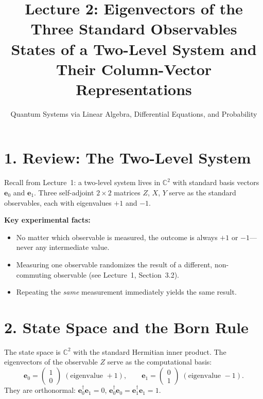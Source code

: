 \documentclass[12pt,a4paper]{article}
\title{\textbf{Lecture 2: Eigenvectors of the Three Standard Observables} \\ \large States of a Two-Level System and Their Column-Vector Representations}
\author{Quantum Systems via Linear Algebra, Differential Equations, and Probability}
\date{}
\begin{document}
\maketitle
\thispagestyle{fancy}

\section{1. Review: The Two-Level System}

Recall from Lecture~1: a two-level system lives in $\mathbb{C}^2$ with standard basis vectors $\mathbf{e}_0$ and $\mathbf{e}_1$.  Three self-adjoint $2\times 2$ matrices $Z$, $X$, $Y$ serve as the standard observables, each with eigenvalues $+1$ and $-1$.

\medskip
\noindent\textbf{Key experimental facts:}
\begin{itemize}[nosep]
    \item No matter which observable is measured, the outcome is always $+1$ or $-1$---never any intermediate value.
    \item Measuring one observable randomizes the result of a different, non-commuting observable (see Lecture~1, Section~3.2).
    \item Repeating the \emph{same} measurement immediately yields the same result.
\end{itemize}

\section{2. State Space and the Born Rule}

The state space is $\mathbb{C}^2$ with the standard Hermitian inner product.  The eigenvectors of the observable $Z$ serve as the computational basis:
\[
    \mathbf{e}_0 = \begin{pmatrix}1\\0\end{pmatrix}\;(\text{eigenvalue }+1), \qquad
    \mathbf{e}_1 = \begin{pmatrix}0\\1\end{pmatrix}\;(\text{eigenvalue }-1).
\]
They are orthonormal: $\mathbf{e}_0^\dagger\mathbf{e}_1 = 0$, $\mathbf{e}_0^\dagger\mathbf{e}_0 = \mathbf{e}_1^\dagger\mathbf{e}_1 = 1$.
\end{document}
